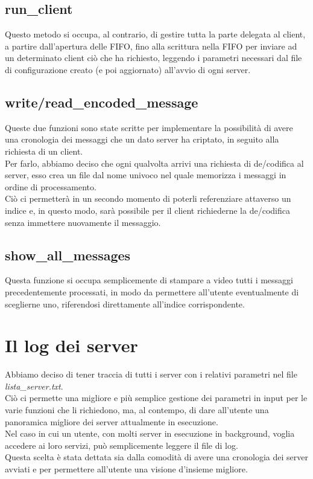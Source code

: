 \documentclass[a4paper,9pt]{article}
\begin{document}
\subsection{run\_client}
Questo metodo si occupa, al contrario, di gestire tutta la parte delegata al client, a partire dall'apertura delle FIFO, fino alla scrittura nella FIFO per inviare ad un determinato client ciò che ha richiesto, leggendo i parametri necessari dal file di configurazione creato (e poi aggiornato) all'avvio di ogni server.
\subsection{write/read\_encoded\_message}
Queste due funzioni sono state scritte per implementare la possibilità di avere una cronologia dei messaggi che un dato server ha criptato, in seguito alla richiesta di un client.\\
Per farlo, abbiamo deciso che ogni qualvolta arrivi una richiesta di de/codifica al server, esso crea un file dal nome univoco nel quale memorizza i messaggi in ordine di processamento.\\
Ciò ci permetterà in un secondo momento di poterli referenziare attaverso un indice e, in questo modo, sarà possibile per il client richiederne la de/codifica senza immettere nuovamente il messaggio.
\subsection{show\_all\_messages}
Questa funzione si occupa semplicemente di stampare a video tutti i messaggi precedentemente processati, in modo da permettere all'utente eventualmente di sceglierne uno, riferendosi direttamente all'indice corrispondente. 

\section{Il log dei server}
Abbiamo deciso di tener traccia di tutti i server con i relativi parametri nel file \emph{lista\_server.txt}.\\ 
Ciò ci permette una migliore e più semplice gestione dei parametri in input per le varie funzioni che li richiedono, ma, al contempo, di dare all'utente una panoramica migliore dei server attualmente in esecuzione.\\
Nel caso in cui un utente, con molti server in esecuzione in background, voglia accedere ai loro servizi, può semplicemente leggere il file di log.\\
Questa scelta è stata dettata sia dalla comodità di avere una cronologia dei server avviati e per permettere all'utente una visione d'insieme migliore.
\end{document}
